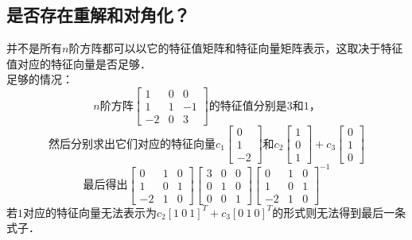 \documentclass[12pt]{article}
\begin{document}
\begin{CJK}{UTF8}{gbsn}
\section{是否存在重解和对角化？}
并不是所有$n$阶方阵都可以以它的特征值矩阵和特征向量矩阵表示，这取决于特征值对应的特征向量是否足够．\\
足够的情况：
\begin{equation}
n\text{阶方阵}\left[
\begin{array}{ccc}
1 & 0 & 0 \\
1 & 1 & -1 \\
-2 & 0 & 3
\end{array}
\right]\text{的特征值分别是}3\text{和}1\text{，}
\end{equation}
\begin{equation}
\text{然后分别求出它们对应的特征向量}
c_1\left[
\begin{array}{c}
0\\1\\-2
\end{array}
\right]
\text{和}
c_2\left[
\begin{array}{c}
1\\0\\1
\end{array}
\right]
+
c_3\left[
\begin{array}{c}
0\\1\\0
\end{array}
\right]
\end{equation}
\begin{equation}
\text{最后得出}
\left[
\begin{array}{ccc}
0 & 1 & 0\\
1 & 0 & 1\\
-2 & 1 & 0
\end{array}
\right]
\left[
\begin{array}{ccc}
3 & 0 & 0\\
0 & 1 & 0\\
0 & 0 & 1
\end{array}
\right]
\left[
\begin{array}{ccc}
0 & 1 & 0\\
1 & 0 & 1\\
-2 & 1 & 0
\end{array}
\right]^{-1}
\end{equation}
若$1$对应的特征向量无法表示为$c_2[1\ 0\ 1]^T+c_3[0\ 1\ 0]^T$的形式则无法得到最后一条式子．

\end{CJK}
\end{document}
